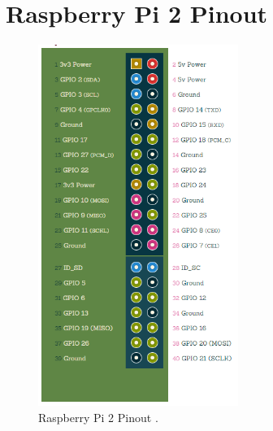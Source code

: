 
\chapter[Appendix C]{Raspberry Pi 2 Pinout}
\label{appendix:rpi2}

\begin{figure}[h]
\begin{center}
\includegraphics[width=65mm,scale=0.5]{./images/pinout.png}
\caption{Raspberry Pi 2 Pinout \cite{pinout}.}
\label{fig:rpi2}
\end{center}
\end{figure}